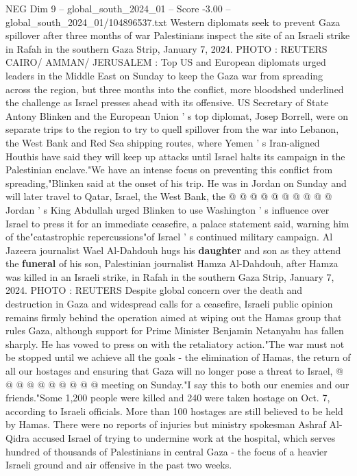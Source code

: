 \begin{textsample}{NEG Dim 9 – global\_south\_2024\_01 – Score -3.00 – global\_south\_2024\_01/104896537.txt}  \label{ex:f9_neg_430}
Western diplomats seek to prevent Gaza spillover after three months of war Palestinians inspect the site of an Israeli strike in Rafah in the southern Gaza Strip, January 7, 2024.
PHOTO : REUTERS CAIRO/ AMMAN/ JERUSALEM : Top US and European diplomats urged leaders in the Middle East on Sunday to keep the Gaza war from spreading across the region, but three months into the conflict, more bloodshed underlined the challenge as Israel presses ahead with its offensive.
US Secretary of State Antony Blinken and the European Union ' s top diplomat, Josep Borrell, were on separate trips to the region to try to quell spillover from the war into Lebanon, the West Bank and Red Sea shipping routes, where Yemen ' s Iran-aligned Houthis have said they will keep up attacks until Israel halts its campaign in the Palestinian enclave."We have an intense focus on preventing this conflict from spreading,"Blinken said at the onset of his trip.
He was in Jordan on Sunday and will later travel to Qatar, Israel, the West Bank, the @ @ @ @ @ @ @ @ @ @ Jordan ' s King Abdullah urged Blinken to use Washington ' s influence over Israel to press it for an immediate ceasefire, a palace statement said, warning him of the"catastrophic repercussions"of Israel ' s continued military campaign.
Al Jazeera journalist Wael Al-Dahdouh hugs his \textbf{daughter} and son as they attend the \textbf{funeral} of his son, Palestinian journalist Hamza Al-Dahdouh, after Hamza was killed in an Israeli strike, in Rafah in the southern Gaza Strip, January 7, 2024.
PHOTO : REUTERS Despite global concern over the death and destruction in Gaza and widespread calls for a ceasefire, Israeli public opinion remains firmly behind the operation aimed at wiping out the Hamas group that rules Gaza, although support for Prime Minister Benjamin Netanyahu has fallen sharply.
He has vowed to press on with the retaliatory action."The war must not be stopped until we achieve all the goals - the elimination of Hamas, the return of all our hostages and ensuring that Gaza will no longer pose a threat to Israel, @ @ @ @ @ @ @ @ @ @ meeting on Sunday."I say this to both our enemies and our friends."Some 1,200 people were killed and 240 were taken hostage on Oct. 7, according to Israeli officials.
More than 100 hostages are still believed to be held by Hamas.
There were no reports of injuries but ministry spokesman Ashraf Al-Qidra accused Israel of trying to undermine work at the hospital, which serves hundred of thousands of Palestinians in central Gaza - the focus of a heavier Israeli ground and air offensive in the past two weeks.

\end{textsample}
